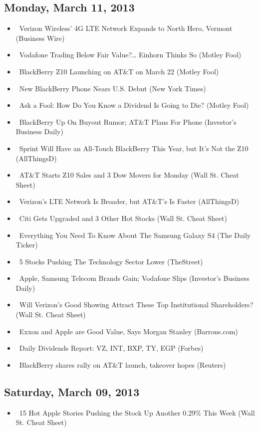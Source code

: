 \documentclass[11pt,asymmetric]{article}
\begin{document}
\subsection*{Monday, March 11, 2013}
\begin{itemize}
\item\ Verizon Wireless’ 4G LTE Network Expands to North Hero, Vermont (Business Wire)
\item\ Vodafone Trading Below Fair Value?… Einhorn Thinks So (Motley Fool)
\item\ BlackBerry Z10 Launching on AT\&T on March 22 (Motley Fool)
\item\ New BlackBerry Phone Nears U.S. Debut (New York Times)
\item\ Ask a Fool: How Do You Know a Dividend Is Going to Die? (Motley Fool)
\item\ BlackBerry Up On Buyout Rumor; AT\&T Plans For Phone (Investor's Business Daily)
\item\ Sprint Will Have an All-Touch BlackBerry This Year, but It's Not the Z10 (AllThingsD)
\item\ AT\&T Starts Z10 Sales and 3 Dow Movers for Monday (Wall St. Cheat Sheet)
\item\ Verizon's LTE Network Is Broader, but AT\&T's Is Faster (AllThingsD)
\item\ Citi Gets Upgraded and 3 Other Hot Stocks (Wall St. Cheat Sheet)
\item\ Everything You Need To Know About The Samsung Galaxy S4 (The Daily Ticker)
\item\ 5 Stocks Pushing The Technology Sector Lower (TheStreet)
\item\ Apple, Samsung Telecom Brands Gain; Vodafone Slips (Investor's Business Daily)
\item\ Will Verizon’s Good Showing Attract These Top Institutional Shareholders? (Wall St. Cheat Sheet)
\item\ Exxon and Apple are Good Value, Says Morgan Stanley (Barrons.com)
\item\ Daily Dividends Report: VZ, INT, BXP, TY, EGP (Forbes)
\item\ BlackBerry shares rally on AT\&T launch, takeover hopes (Reuters)
\end{itemize}
\subsection*{Saturday, March 09, 2013}
\begin{itemize}
\item\ 15 Hot Apple Stories Pushing the Stock Up Another 0.29\% This Week (Wall St. Cheat Sheet)
\end{itemize}
\end{document}
